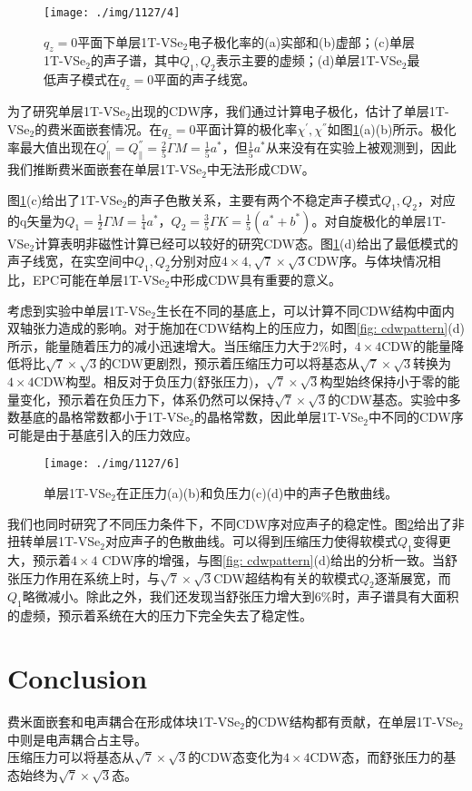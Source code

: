 \documentclass[reprint, aps, prb, showkeys]{revtex4-2}
\begin{document}
\begin{figure}[b]
    \texttt{[image: ./img/1127/4]}
    \caption{\label{fig: monolayer} 
    $q_z = 0$平面下单层1T-VSe$_2$电子极化率的(a)实部和(b)虚部；(c)单层1T-VSe$_2$的声子谱，其中$Q_1, Q_2$表示主要的虚频；(d)单层1T-VSe$_2$最低声子模式在$q_z = 0$平面的声子线宽。
    }
\end{figure}

为了研究单层1T-VSe$_2$出现的CDW序，我们通过计算电子极化，估计了单层1T-VSe$_2$的费米面嵌套情况。在$q_z = 0$平面计算的极化率$\chi^{'}, \chi^{''}$如图\ref{fig: monolayer}(a)(b)所示。极化率最大值出现在$Q_{\parallel}^{'} = Q_{\parallel}^{''} = \frac{2}{5} {\Gamma}M = \frac{1}{5}a^*$，但$\frac{1}{5}a^*$从来没有在实验上被观测到，因此我们推断费米面嵌套在单层1T-VSe$_2$中无法形成CDW。

图\ref{fig: monolayer}(c)给出了1T-VSe$_2$的声子色散关系，主要有两个不稳定声子模式$Q_1, Q_2$，对应的q矢量为$Q_1 = \frac{1}{2}{\Gamma}M = \frac{1}{4}a^*$，$Q_2 = \frac{3}{5} {\Gamma}K = \frac{1}{5}(a^* + b^*)$。对自旋极化的单层1T-VSe$_2$计算表明非磁性计算已经可以较好的研究CDW态。图\ref{fig: monolayer}(d)给出了最低模式的声子线宽，在实空间中$Q_1, Q_2$分别对应$4 \times 4, \sqrt{7} \times \sqrt{3}$CDW序。与体块情况相比，EPC可能在单层1T-VSe$_2$中形成CDW具有重要的意义。

考虑到实验中单层1T-VSe$_2$生长在不同的基底上，可以计算不同CDW结构中面内双轴张力造成的影响。对于施加在CDW结构上的压应力，如图\ref{fig: cdwpattern}(d)所示，能量随着压力的减小迅速增大。当压缩压力大于2\%时，$4 \times 4$CDW的能量降低将比$\sqrt{7} \times \sqrt{3}$的CDW更剧烈，预示着压缩压力可以将基态从$\sqrt{7} \times \sqrt{3}$转换为$4 \times 4$CDW构型。相反对于负压力(舒张压力)，$\sqrt{7} \times \sqrt{3}$构型始终保持小于零的能量变化，预示着在负压力下，体系仍然可以保持$\sqrt{7} \times \sqrt{3}$的CDW基态。实验中多数基底的晶格常数都小于1T-VSe$_2$的晶格常数，因此单层1T-VSe$_2$中不同的CDW序可能是由于基底引入的压力效应。
\begin{figure}[b]
    \texttt{[image: ./img/1127/6]}
    \caption{\label{fig: phonon strain} 
    单层1T-VSe$_2$在正压力(a)(b)和负压力(c)(d)中的声子色散曲线。
    }
\end{figure}

我们也同时研究了不同压力条件下，不同CDW序对应声子的稳定性。图\ref{fig: phonon strain}给出了非扭转单层1T-VSe$_2$对应声子的色散曲线。可以得到压缩压力使得软模式$Q_1$变得更大，预示着$4 \times 4$ CDW序的增强，与图\ref{fig: cdwpattern}(d)给出的分析一致。当舒张压力作用在系统上时，与$\sqrt{7} \times \sqrt{3}$CDW超结构有关的软模式$Q_2$逐渐展宽，而$Q_1$略微减小。除此之外，我们还发现当舒张压力增大到6\%时，声子谱具有大面积的虚频，预示着系统在大的压力下完全失去了稳定性。

\section{Conclusion}
费米面嵌套和电声耦合在形成体块1T-VSe$_2$的CDW结构都有贡献，在单层1T-VSe$_2$中则是电声耦合占主导。\\
压缩压力可以将基态从$\sqrt{7} \times \sqrt{3}$的CDW态变化为$4 \times 4$CDW态，而舒张压力的基态始终为$\sqrt{7} \times \sqrt{3}$态。
\end{document}
